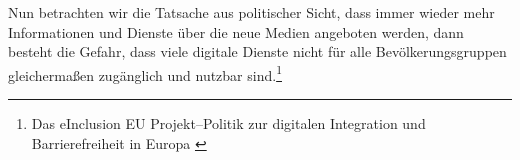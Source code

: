 Nun betrachten wir die Tatsache aus politischer Sicht, dass immer wieder mehr Informationen und Dienste über die neue Medien angeboten werden, dann besteht die Gefahr, dass viele digitale Dienste nicht für alle Bevölkerungsgruppen gleichermaßen zugänglich und nutzbar sind.\footnote{Das eInclusion EU Projekt--Politik zur digitalen Integration und Barrierefreiheit in Europa \cite{redingeinclusion}}
